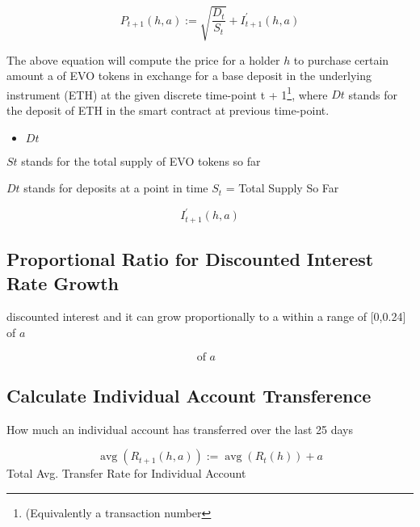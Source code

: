 \begin{tcolorbox}
	\label{eq:Base Primitive Equation}
	
	
	\begin{equation}
		P_{t+1}(h, a):=\sqrt{\frac{D_{t}}{S_{t}}}+I_{t+1}^{\prime}(h, a)
	\end{equation}
	
\end{tcolorbox}

The above equation will compute the price for a holder $h$ to purchase
certain amount a of EVO tokens in exchange for a base deposit in the underlying instrument (ETH) at the given discrete time-point {t + 1}\footnote{(Equivalently a transaction
number}, where $Dt$ stands for the deposit of ETH in the smart contract at previous time-point.

\begin{itemize}
	\item $Dt$
\end{itemize}


\label{total.supply.minted-evo}
$St$ stands for the total supply of EVO tokens so far

\label{deposits.discrete}
$Dt$  stands for deposits at a point in time 
\newline
\label{total.supply.so-far}
$S_t$ = Total Supply So Far

\begin{equation}
	I_{t+1}^{\prime}(h, a)
\end{equation}

\newpage

\subsection{Proportional Ratio for Discounted Interest Rate Growth}
discounted interest and it can grow proportionally to a within
a range of [0,0.24] of $a$

\label{discounted.interest.range}
\begin{equation}
	[0,0.24] \text{of $a$ }
\end{equation}

\subsection{Calculate Individual Account Transference}
How much an individual account has transferred over the last 25 days 

\label{total.individual.avg.transfer.rate}
\begin{equation}
	\operatorname{avg}\left(R_{t+1}(h, a)\right):=\operatorname{avg}\left(R_{t}(h)\right)+a
\end{equation}
Total Avg. Transfer Rate for Individual Account
\newline



